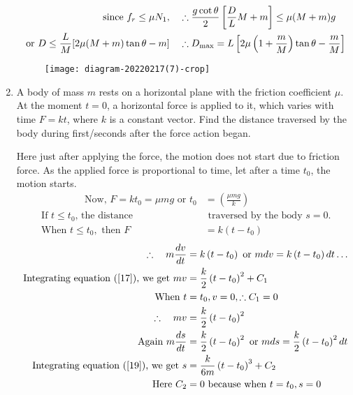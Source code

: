 \begin{enumerate}
\begin{answer}
\begin{align}
	\text{since }f_{r} \leq \mu N_{1}, \quad &\therefore \frac{g \cot \theta}{2}\left[\frac{D}{L} M+m\right] \leq \mu(M+m) g\notag\\
\text{	or }D \leq \frac{L}{M}[2 \mu(M+m) \tan \theta-m] \quad &\therefore D_{\max }=L\left[2 \mu\left(1+\frac{m}{M}\right) \tan \theta-\frac{m}{M}\right]\notag
	\end{align}
 \begin{figure}[H]
 	\centering
 	\texttt{[image: diagram-20220217(7)-crop]}
 \end{figure}
\end{answer}
\item A body of mass $m$ rests on a horizontal plane with the friction coefficient $\mu .$ At the moment $t=0$, a horizontal force is applied to it, which varies with time $F=k t$, where $k$ is a constant vector. Find the distance traversed by the body during first/seconds after the force action began.
\begin{answer}
	Here just after applying the force, the motion does not start due to friction force. As the applied force is proportional to time, let after a time $t_{0}$, the motion starts.
	\begin{align*}
\hspace{2cm}	\text{Now, }F=k t_{0}=\mu m g\text{ or }t_{0}&=\left(\frac{\mu m g}{k}\right)\\
\text{	If $t \leq t_{0}$, the distance}&\text{ traversed by the body $s=0 .$}\\
\text{	When }t \leq t_{0},\text{ then }F&=k\left(t-t_{0}\right)
	\end{align*}
	\begin{align}
	\therefore \quad m \frac{d v}{d t}&=k\left(t-t_{0}\right)\text{ or }m d v=k\left(t-t_{0}\right) d t \ldots \label{17}\\
\text{	Integrating equation (\ref{17}), we get } m v&=\frac{k}{2}\left(t-t_{0}\right)^{2}+C_{1}\notag\\
	\text{When }t&=t_{0}, v=0, \therefore C_{1}=0\notag\\
	\therefore \quad m v&=\frac{k}{2}\left(t-t_{0}\right)^{2}\\
	\text{Again }m \frac{d s}{d t}&=\frac{k}{2}\left(t-t_{0}\right)^{2}\text{ or }m d s=\frac{k}{2}\left(t-t_{0}\right)^{2} d t\label{19}\\
	\text{Integrating equation (\ref{19}), we get }s&=\frac{k}{6 m}\left(t-t_{0}\right)^{3}+C_{2}\notag\\
\text{	Here }C_{2}&=0\text{ because when }t=t_{0}, s=0\notag\\

\end{align}
\end{answer}
\end{enumerate}
